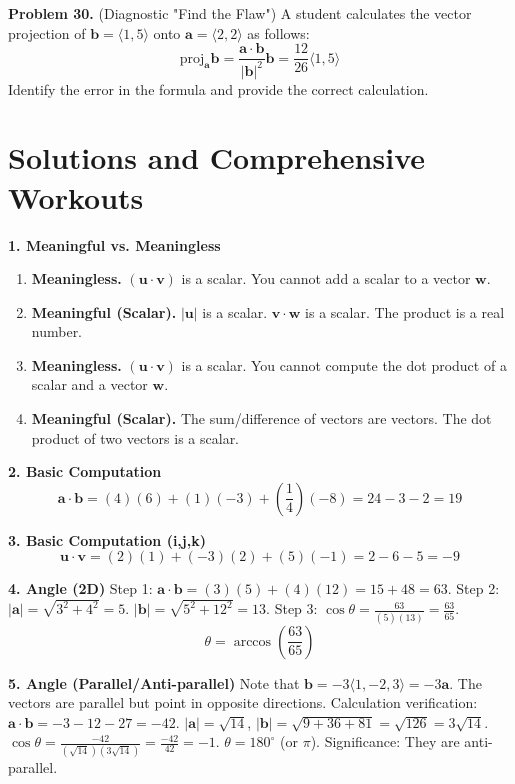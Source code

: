 \documentclass[12pt]{article}
\begin{document}
\textbf{Problem 30.} (Diagnostic "Find the Flaw") A student calculates the vector projection of $\mathbf{b} = \langle 1, 5 \rangle$ onto $\mathbf{a} = \langle 2, 2 \rangle$ as follows:
$$ \text{proj}_{\mathbf{a}} \mathbf{b} = \frac{\mathbf{a} \cdot \mathbf{b}}{|\mathbf{b}|^2} \mathbf{b} = \frac{12}{26} \langle 1, 5 \rangle $$
Identify the error in the formula and provide the correct calculation.

\newpage
\section*{Solutions and Comprehensive Workouts}

\textbf{1. Meaningful vs. Meaningless}
\begin{enumerate}[label=(\alph*)]
    \item \textbf{Meaningless.} $(\mathbf{u} \cdot \mathbf{v})$ is a scalar. You cannot add a scalar to a vector $\mathbf{w}$.
    \item \textbf{Meaningful (Scalar).} $|\mathbf{u}|$ is a scalar. $\mathbf{v} \cdot \mathbf{w}$ is a scalar. The product is a real number.
    \item \textbf{Meaningless.} $(\mathbf{u} \cdot \mathbf{v})$ is a scalar. You cannot compute the dot product of a scalar and a vector $\mathbf{w}$.
    \item \textbf{Meaningful (Scalar).} The sum/difference of vectors are vectors. The dot product of two vectors is a scalar.
\end{enumerate}

\textbf{2. Basic Computation}
$$ \mathbf{a} \cdot \mathbf{b} = (4)(6) + (1)(-3) + (\frac{1}{4})(-8) = 24 - 3 - 2 = 19 $$

\textbf{3. Basic Computation (i,j,k)}
$$ \mathbf{u} \cdot \mathbf{v} = (2)(1) + (-3)(2) + (5)(-1) = 2 - 6 - 5 = -9 $$

\textbf{4. Angle (2D)}
Step 1: $\mathbf{a} \cdot \mathbf{b} = (3)(5) + (4)(12) = 15 + 48 = 63$.
Step 2: $|\mathbf{a}| = \sqrt{3^2+4^2} = 5$. $|\mathbf{b}| = \sqrt{5^2+12^2} = 13$.
Step 3: $\cos \theta = \frac{63}{(5)(13)} = \frac{63}{65}$.
$$ \theta = \arccos\left(\frac{63}{65}\right) $$

\textbf{5. Angle (Parallel/Anti-parallel)}
Note that $\mathbf{b} = -3\langle 1, -2, 3 \rangle = -3\mathbf{a}$.
The vectors are parallel but point in opposite directions.
Calculation verification:
$\mathbf{a} \cdot \mathbf{b} = -3 - 12 - 27 = -42$.
$|\mathbf{a}| = \sqrt{14}$, $|\mathbf{b}| = \sqrt{9+36+81} = \sqrt{126} = 3\sqrt{14}$.
$\cos \theta = \frac{-42}{(\sqrt{14})(3\sqrt{14})} = \frac{-42}{42} = -1$.
$\theta = 180^\circ$ (or $\pi$). Significance: They are anti-parallel.
\end{document}
